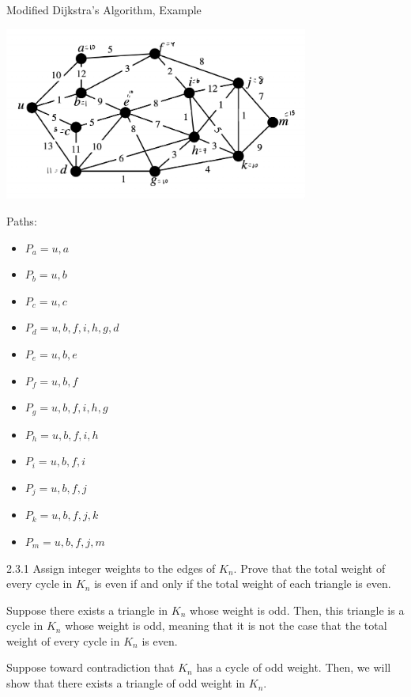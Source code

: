 \documentclass[8pt]{extarticle}
\begin{document}
{\begin{problem}{Modified Dijkstra's Algorithm, Example}
\begin{center}
    \end{center}
    \tcblower
    \begin{center} 
      \includegraphics[width=10cm]{2_3_dijkstra}
    \end{center}
    Paths:
    \begin{multicols}{2}
    \begin{itemize}
      \item $P_a = u,a$
      \item $P_b = u,b$
      \item $P_c = u,c$
      \item $P_d = u,b,f,i,h,g,d$
      \item $P_e = u,b,e$
      \item $P_f = u,b,f$
      \item $P_g = u,b,f,i,h,g$
      \item $P_h = u,b,f,i,h$
      \item $P_i = u,b,f,i$
      \item $P_j = u,b,f,j$
      \item $P_k = u,b,f,j,k$
      \item $P_m = u,b,f,j,m$
    \end{itemize}
    \end{multicols}
  \end{problem}
  \begin{problem}{2.3.1}
    Assign integer weights to the edges of $K_n$. Prove that the total weight of every cycle in $K_n$ is even if and only if the total weight of each triangle is even.
    \tcblower
    \begin{description}[font=\normalfont\scshape]
      \item[$(\Rightarrow)$] Suppose there exists a triangle in $K_n$ whose weight is odd. Then, this triangle is a cycle in $K_n$ whose weight is odd, meaning that it is not the case that the total weight of every cycle in $K_n$ is even.
      \item[$(\Leftarrow)$] Suppose toward contradiction that $K_n$ has a cycle of odd weight. Then, we will show that there exists a triangle of odd weight in $K_n$.

\end{description}
\end{problem}}
\end{document}
